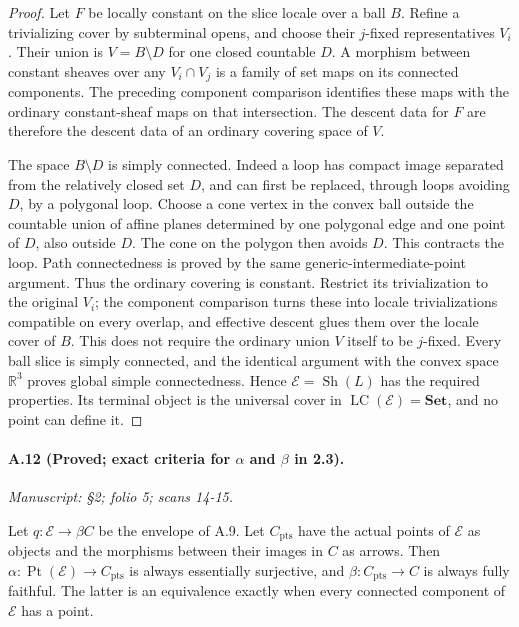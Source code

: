 \begin{proof}
Let $F$ be locally constant on the slice locale over a ball $B$. Refine a trivializing cover by subterminal opens, and choose their $j$-fixed representatives $V_i$. Their union is $V=B\setminus D$ for one closed countable $D$. A morphism between constant sheaves over any $V_i\cap V_j$ is a family of set maps on its connected components. The preceding component comparison identifies these maps with the ordinary constant-sheaf maps on that intersection. The descent data for $F$ are therefore the descent data of an ordinary covering space of $V$.

The space $B\setminus D$ is simply connected. Indeed a loop has compact image separated from the relatively closed set $D$, and can first be replaced, through loops avoiding $D$, by a polygonal loop. Choose a cone vertex in the convex ball outside the countable union of affine planes determined by one polygonal edge and one point of $D$, also outside $D$. The cone on the polygon then avoids $D$. This contracts the loop. Path connectedness is proved by the same generic-intermediate-point argument. Thus the ordinary covering is constant. Restrict its trivialization to the original $V_i$; the component comparison turns these into locale trivializations compatible on every overlap, and effective descent glues them over the locale cover of $B$. This does not require the ordinary union $V$ itself to be $j$-fixed. Every ball slice is simply connected, and the identical argument with the convex space $\mathbb R^3$ proves global simple connectedness. Hence $\mathcal E=\operatorname{Sh}(L)$ has the required properties. Its terminal object is the universal cover in $\operatorname{LC}(\mathcal E)=\mathbf{Set}$, and no point can define it. 
\end{proof}

\paragraph{A.12 (Proved; exact criteria for $\alpha$ and $\beta$ in 2.3).}
\textit{Manuscript: \S 2; folio 5; scans 14-15.}

Let $q:\mathcal E\to\beta C$ be the envelope of A.9. Let $C_{\mathrm{pts}}$ have the actual points of $\mathcal E$ as objects and the morphisms between their images in $C$ as arrows. Then $\alpha:\operatorname{Pt}(\mathcal E)\to C_{\mathrm{pts}}$ is always essentially surjective, and $\beta:C_{\mathrm{pts}}\to C$ is always fully faithful. The latter is an equivalence exactly when every connected component of $\mathcal E$ has a point.

